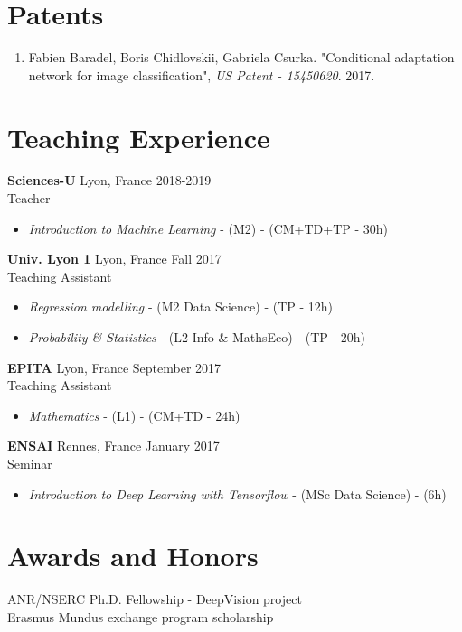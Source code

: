 \documentclass[10pt]{res} %
\begin{document}
\begin{resume}
\section{\large Patents}
\begin{enumerate}[wide=0pt]
	\item Fabien Baradel, Boris Chidlovskii, Gabriela Csurka. "Conditional adaptation network for image classification",  \textit{US Patent - 15450620}. 2017.
\end{enumerate}


\section{\large Teaching Experience}
\textbf{Sciences-U} \hfill Lyon, France \hfill 2018-2019 \\
Teacher
\begin{itemize}
	\item \textit{Introduction to Machine Learning} - (M2) - (CM+TD+TP - 30h)
\end{itemize}

\textbf{Univ. Lyon 1} \hfill Lyon, France \hfill Fall 2017 \\
Teaching Assistant
\begin{itemize}
	\item \textit{Regression modelling}  - (M2 Data Science) - (TP - 12h)
	\item \textit{Probability \& Statistics}  - (L2 Info \& MathsEco) - (TP - 20h)
\end{itemize}

\textbf{EPITA} \hfill Lyon, France \hfill September 2017 \\
Teaching Assistant
\begin{itemize}
	\item \textit{Mathematics} - (L1) - (CM+TD - 24h)
\end{itemize}

\textbf{ENSAI} \hfill Rennes, France \hfill January 2017 \\
Seminar
\begin{itemize}
\item \textit{Introduction to Deep Learning with Tensorflow} - (MSc Data Science) - (6h)
\end{itemize}


\section{\large Awards and Honors} 
ANR/NSERC Ph.D. Fellowship - DeepVision project \\
Erasmus Mundus exchange program scholarship


\end{resume}
\end{document}
